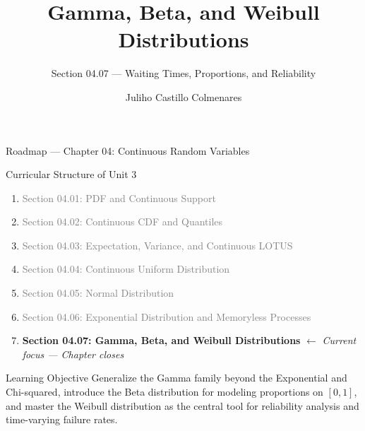 \documentclass[aspectratio=169,xcolor={dvipsnames,table}]{beamer}
\title{Gamma, Beta, and Weibull Distributions}
\subtitle{Section 04.07 --- Waiting Times, Proportions, and Reliability}
\author[J. Castillo Colmenares]{Juliho Castillo Colmenares}
\institute[Tec de Monterrey]{Tecnologico de Monterrey}
\date{\vspace{-1.5cm}}
\begin{document}
\begin{frame}[plain]
	\titlepage
\end{frame}

\begin{frame}{Roadmap --- Chapter 04: Continuous Random Variables}
	\vspace{-0.15cm}
	\begin{block}{Curricular Structure of Unit 3}
		\footnotesize
		\begin{enumerate}\itemsep=0.03cm
			\item \textcolor{gray}{Section 04.01: PDF and Continuous Support}
			\item \textcolor{gray}{Section 04.02: Continuous CDF and Quantiles}
			\item \textcolor{gray}{Section 04.03: Expectation, Variance, and Continuous LOTUS}
			\item \textcolor{gray}{Section 04.04: Continuous Uniform Distribution}
			\item \textcolor{gray}{Section 04.05: Normal Distribution}
			\item \textcolor{gray}{Section 04.06: Exponential Distribution and Memoryless Processes}
			\item \textbf{\textcolor{TecRojo}{Section 04.07: Gamma, Beta, and Weibull Distributions}} $\leftarrow$ \emph{Current focus --- Chapter closes}
		\end{enumerate}
	\end{block}
	\vspace{-0.2cm}
	\begin{alertblock}{Learning Objective}
		\scriptsize
		Generalize the Gamma family beyond the Exponential and Chi-squared, introduce the Beta distribution for modeling proportions on $[0,1]$, and master the Weibull distribution as the central tool for reliability analysis and time-varying failure rates.
	\end{alertblock}
\end{frame}
\end{document}
